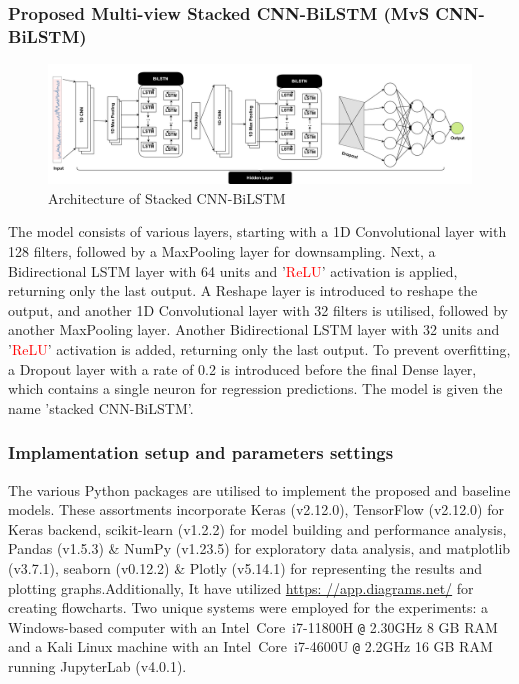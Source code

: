 \documentclass[a4paper, fleqn]{cas-sc}
\theoremstyle{definition}
\theoremstyle{remark}
\begin{document}
\subsubsection{Proposed Multi-view Stacked CNN-BiLSTM (MvS CNN-BiLSTM)}
\begin{figure}[h!]
	\centering
		\includegraphics[scale=0.45]{Prpose}
	  \caption{Architecture of Stacked CNN-BiLSTM}\label{prosed_cnn-bilstm}
\end{figure}

The model consists of various layers,  starting with a 1D Convolutional layer with 128 filters,  followed by a MaxPooling layer for downsampling. Next,  a Bidirectional LSTM layer with 64 units and '\textcolor{red}{ReLU}' activation is applied,  returning only the last output. A Reshape layer is introduced to reshape the output, and another 1D Convolutional layer with 32 filters is utilised,  followed by another MaxPooling layer. Another Bidirectional LSTM layer with 32 units and '\textcolor{red}{ReLU}' activation is added, returning only the last output. To prevent overfitting,  a Dropout layer with a rate of 0.2 is introduced before the final Dense layer,  which contains a single neuron for regression predictions. The model is given the name 'stacked CNN-BiLSTM'.

\subsubsection{Implamentation setup and parameters settings}
The various Python packages are utilised to implement the proposed and baseline models. These assortments incorporate Keras (v2.12.0),  TensorFlow (v2.12.0) for Keras backend,  scikit-learn (v1.2.2) for model building and performance analysis,  Pandas (v1.5.3) \& NumPy (v1.23.5) for exploratory data analysis,  and matplotlib (v3.7.1),  seaborn (v0.12.2) \& Plotly (v5.14.1) for representing the results and plotting graphs.Additionally,  It have utilized \href{https: //app.diagrams.net/}{https: //app.diagrams.net/} for creating flowcharts. Two unique systems were employed for the experiments:  a Windows-based computer with an Intel\textregistered ~Core\texttrademark ~i7-11800H \texttt{@} 2.30GHz 8 GB RAM and a Kali Linux machine with an Intel\textregistered ~Core\texttrademark ~i7-4600U \texttt{@} 2.2GHz 16 GB RAM running JupyterLab (v4.0.1).
\end{document}
